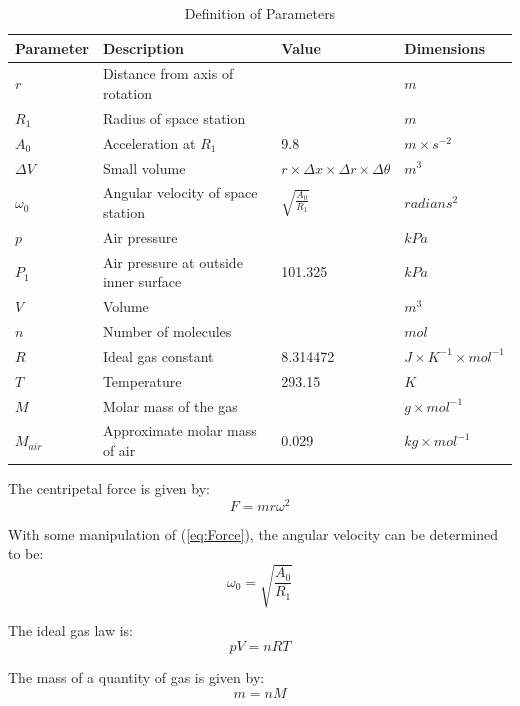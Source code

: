 \documentclass[10pt, openany]{article}
\begin{document}
\begin{table}[ht]
\centering
\caption{Definition of Parameters}
\vspace{1ex}
\label{tbl:Param}
\begin{tabular}{|l|l|l|l|}
\hline
Parameter & Description & Value & Dimensions\\ \hline
$r$ & Distance from axis of rotation & & $m$\\ \hline
$R_{1}$ & Radius of space station & & $m$\\ \hline
$A_{0}$ & Acceleration at $R_{1}$ & 9.8 & $m \times s^{-2}$\\ \hline
$\Delta V$ & Small volume & $r \times \Delta x \times \Delta r \times \Delta\theta$ & $m^{3}$\\ \hline
$\omega_{0}$ & Angular velocity of space station & $\sqrt{\frac{A_{0}}{R_{1}}}$ & $radians^{2}$\\ \hline
$p$ & Air pressure & & $kPa$\\ \hline
$P_{1}$ & Air pressure at outside inner surface & 101.325 & $kPa$\\ \hline
$V$ & Volume & & $m^{3}$\\ \hline
$n$ & Number of molecules & & $mol$\\ \hline
$R$ & Ideal gas constant & 8.314472 & $J \times K^{-1} \times mol^{-1}$\\ \hline
$T$ & Temperature & 293.15 & $K$\\ \hline
$M$ & Molar mass of the gas & & $g \times mol^{-1}$\\ \hline
$M_{air}$ & Approximate molar mass of air & 0.029 & $kg \times mol^{-1}$\\ \hline
\end{tabular}
\end{table}

The centripetal force is given by:
\begin{equation}\label{eq:Force}
F=mr\omega^2
\end{equation}

With some manipulation of (\ref{eq:Force}), the angular velocity can be determined to be:
\begin{equation}\label{eq:Angular}
\omega_{0} = \sqrt{\frac{A_{0}}{R_{1}}}
\end{equation}

The ideal gas law is:
\begin{equation}\label{eq:Gas}
pV=nRT
\end{equation}

The mass of a quantity of gas is given by:
\begin{equation}\label{eq:Mass}
m = nM
\end{equation}
\end{document}
